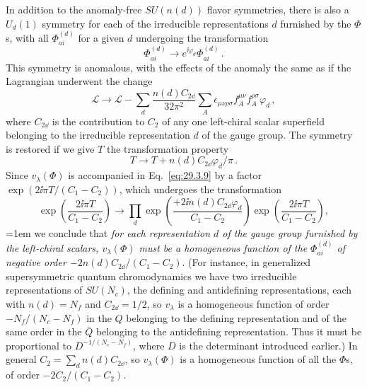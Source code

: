 In addition to the anomaly-free \(SU(n(d))\) flavor symmetries, there is
also a \(U_d(1)\) symmetry for each of the irreducible representations
\(d\) furnished by the \(\Phi\)s, with all \(\Phi_{ai}^{(d)}\) for a
given \(d\) undergoing the transformation
\begin{equation}
  \Phi_{ai}^{(d)}
  \longrightarrow
  e^{\ii\varphi_d}\Phi_{ai}^{(d)}\,.
  \tag{29.3.17}\label{eq:29.3.17}
\end{equation}
This symmetry is anomalous, with the effects of the anomaly the same as if
the Lagrangian underwent the change
\begin{equation}
  \mathcal{L}
  \longrightarrow
  \mathcal{L}
  -\sum_d\frac{n(d)C_{2\dd}}{32\pi^2}
  \sum_A\epsilon_{\mu\nu\rho\sigma}
  f_A^{\mu\nu}f_A^{\rho\sigma}\varphi_d\,,
  \tag{29.3.18}\label{eq:29.3.18}
\end{equation}
where \(C_{2\dd}\) is the contribution to \(C_2\) of any one left-chiral
scalar superfield belonging to the irreducible representation \(d\) of the
gauge group. The symmetry is restored if we give \(T\) the transformation
property
\begin{equation}
  T\longrightarrow T+n(d)C_{2\dd}\varphi_d/\pi\,.
  \tag{29.3.19}\label{eq:29.3.19}
\end{equation}
Since \(v_\lambda(\Phi)\) is accompanied in Eq.~\eqref{eq:29.3.9} by a
factor \(\exp(2\ii\pi T/(C_1-C_2))\), which undergoes the transformation
\begin{equation}
  \exp\left(\frac{2\ii\pi T}{C_1-C_2}\right)
  \longrightarrow
  \prod_d
  \exp\left(\frac{+2\ii n(d)C_{2\dd}\varphi_d}{C_1-C_2}\right)
  \exp\left(\frac{2\ii\pi T}{C_1-C_2}\right),
  \tag{29.3.20}\label{eq:29.3.20}
\end{equation}
\begingroup
\emergencystretch=1em
we conclude that \emph{for each representation \(d\) of the gauge group
furnished by the left-chiral scalars, \(v_\lambda(\Phi)\) must be a
homogeneous function of the \(\Phi_{ai}^{(d)}\) of negative order
\(-2n(d)C_{2\dd}/(C_1-C_2)\)}. (For instance, in generalized supersymmetric
quantum chromodynamics we have two irreducible representations of
\(SU(N_c)\), the defining and antidefining representations, each with
\(n(d)=N_f\) and \(C_{2\dd}=1/2\), so \(v_\lambda\) is a homogeneous
function of order \(-N_f/(N_c-N_f)\) in the \(Q\) belonging to the
defining representation and of the same order in the \(\bar Q\) belonging
to the antidefining representation. Thus it must be proportional to
\(D^{-1/(N_c-N_f)}\), where \(D\) is the determinant introduced earlier.)
In general \(C_2=\sum_d n(d)C_{2\dd}\), so \(v_\lambda(\Phi)\) is a
homogeneous function of all the \(\Phi\)s, of order
\(-2C_2/(C_1-C_2)\).
\par
\endgroup

